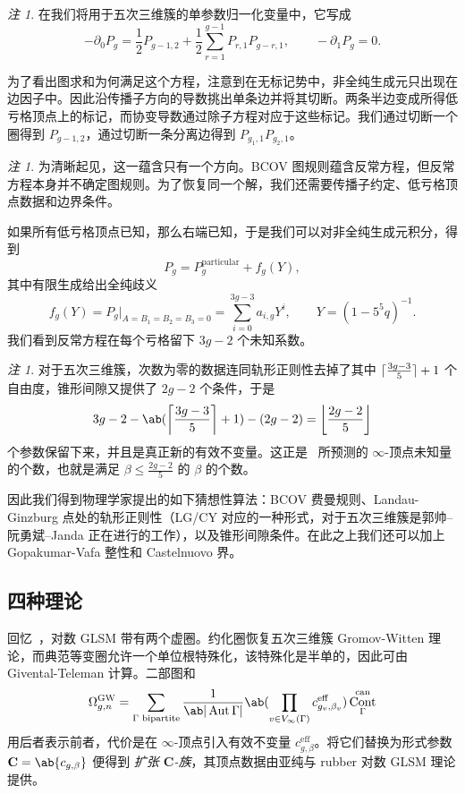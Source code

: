 \documentclass{amsart}
\theoremstyle{definition}
\theoremstyle{remark}
\newtheorem{rmk}[thm]{注}
\theoremstyle{plain}
\theoremstyle{definition}
\theoremstyle{remark}
\DeclarePairedDelimiter{\floor}{\lfloor}{\rfloor}
\DeclarePairedDelimiter{\ceil}{\lceil}{\rceil}
\newcommand{\mbf}[1]{\mathbf{#1}}
\newcommand{\mr}[1]{\mathrm{#1}}
\newcommand{\1}{\mathbf{1}}
\newcommand{\2}{\mathbf{2}}
\newcommand{\3}{\mathbf{3}}
\DeclareMathOperator{\Aut}{Aut}
\DeclareMathOperator{\Cont}{Cont}
\begin{document}
\begin{rmk}
    在我们将用于五次三维簇的单参数归一化变量中，它写成
    \[ -\partial_0 P_g = \frac{1}{2}P_{g-1,2} + \frac{1}{2}\sum_{r=1}^{g-1}P_{r,1}P_{g-r,1}, \qquad -\partial_1 P_g = 0. \]
\end{rmk}

为了看出图求和为何满足这个方程，注意到在无标记势中，非全纯生成元只出现在边因子中。因此沿传播子方向的导数挑出单条边并将其切断。两条半边变成所得低亏格顶点上的标记，而协变导数通过除子方程对应于这些标记。我们通过切断一个圈得到 \(P_{g-1,2}\)，通过切断一条分离边得到 \(P_{g_1,1}P_{g_2,1}\)。

\begin{rmk}
    为清晰起见，这一蕴含只有一个方向。BCOV 图规则蕴含反常方程，但反常方程本身并不确定图规则。为了恢复同一个解，我们还需要传播子约定、低亏格顶点数据和边界条件。
\end{rmk}

如果所有低亏格顶点已知，那么右端已知，于是我们可以对非全纯生成元积分，得到
\[ P_g = P_g^{\mr{particular}} + f_g(Y), \]
其中有限生成给出全纯歧义
\[ f_g(Y) = P_g|_{A = B_1 = B_2 = B_3 = 0} = \sum_{i=0}^{3g-3}a_{i,g}Y^i, \qquad Y = (1-5^5q)^{-1}. \]
我们看到反常方程在每个亏格留下 \(3g-2\) 个未知系数。

\begin{rmk}
    对于五次三维簇，次数为零的数据连同轨形正则性去掉了其中 \(\ceil{\frac{3g-3}{5}}+1\) 个自由度，锥形间隙又提供了 \(2g-2\) 个条件，于是
    \[ 3g-2 - \ab(\ceil*{\frac{3g-3}{5}}+1) - (2g-2) = \floor*{\frac{2g-2}{5}} \]
    个参数保留下来，并且是真正新的有效不变量。这正是~ 所预测的 \(\infty\)-顶点未知量的个数，也就是满足 \(\beta \leq \frac{2g-2}{5}\) 的 \(\beta\) 的个数。
\end{rmk}

因此我们得到物理学家提出的如下猜想性算法：BCOV 费曼规则、Landau-Ginzburg 点处的轨形正则性（LG/CY 对应的一种形式，对于五次三维簇是郭帅–阮勇斌–Janda 正在进行的工作），以及锥形间隙条件。在此之上我们还可以加上 Gopakumar-Vafa 整性和 Castelnuovo 界。

\subsection{四种理论}%
\label{sub:Four theories}

回忆~，对数 GLSM 带有两个虚圈。约化圈恢复五次三维簇 Gromov-Witten 理论，而典范等变圈允许一个单位根特殊化，该特殊化是半单的，因此可由 Givental-Teleman 计算。二部图和
\[ \Omega^{\mr{GW}}_{g,n} = \sum_{\Gamma \text{ bipartite}} \frac{1}{\ab|\Aut \Gamma|} \ab( \prod_{v \in V_{\infty}(\Gamma)} c^{\mr{eff}}_{g_v,\beta_v}) \Cont^{\mr{can}}_{\Gamma} \]
用后者表示前者，代价是在 \(\infty\)-顶点引入有效不变量 \(c^{\mr{eff}}_{g,\beta}\)。将它们替换为形式参数 \(\mbf{C} = \ab\{c_{g,\beta}\}\) 便得到 \textit{扩张 \(\mbf{C}\)-族}，其顶点数据由亚纯与 rubber 对数 GLSM 理论提供。
\end{document}
